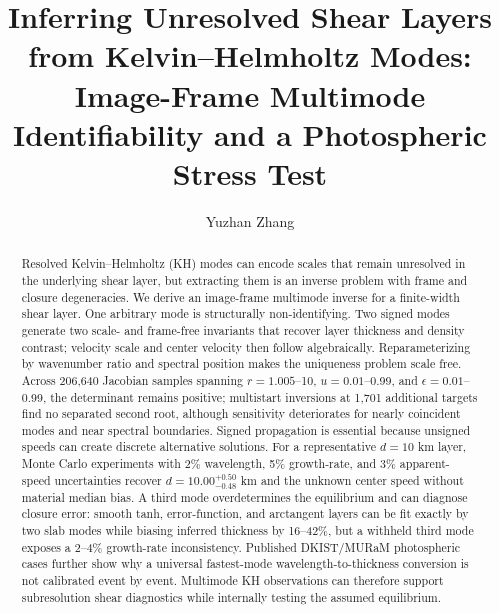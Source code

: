 \documentclass[linenumbers]{aastex7}
\begin{document}
\title{Inferring Unresolved Shear Layers from Kelvin--Helmholtz Modes: Image-Frame Multimode Identifiability and a Photospheric Stress Test}

\author[0009-0000-3121-7972,gname='Yuzhan',sname='Zhang']{Yuzhan Zhang}

\begin{abstract}
Resolved Kelvin--Helmholtz (KH) modes can encode scales that remain unresolved in the underlying shear layer, but extracting them is an inverse problem with frame and closure degeneracies. We derive an image-frame multimode inverse for a finite-width shear layer. One arbitrary mode is structurally non-identifying. Two signed modes generate two scale- and frame-free invariants that recover layer thickness and density contrast; velocity scale and center velocity then follow algebraically. Reparameterizing by wavenumber ratio and spectral position makes the uniqueness problem scale free. Across 206,640 Jacobian samples spanning $r=1.005$--10, $u=0.01$--0.99, and $\epsilon=0.01$--0.99, the determinant remains positive; multistart inversions at 1,701 additional targets find no separated second root, although sensitivity deteriorates for nearly coincident modes and near spectral boundaries. Signed propagation is essential because unsigned speeds can create discrete alternative solutions. For a representative $d=10$ km layer, Monte Carlo experiments with 2\% wavelength, 5\% growth-rate, and 3\% apparent-speed uncertainties recover $d=10.00^{+0.50}_{-0.48}$ km and the unknown center speed without material median bias. A third mode overdetermines the equilibrium and can diagnose closure error: smooth tanh, error-function, and arctangent layers can be fit exactly by two slab modes while biasing inferred thickness by 16--42\%, but a withheld third mode exposes a 2--4\% growth-rate inconsistency. Published DKIST/MURaM photospheric cases further show why a universal fastest-mode wavelength-to-thickness conversion is not calibrated event by event. Multimode KH observations can therefore support subresolution shear diagnostics while internally testing the assumed equilibrium.
\end{abstract}

\end{document}
